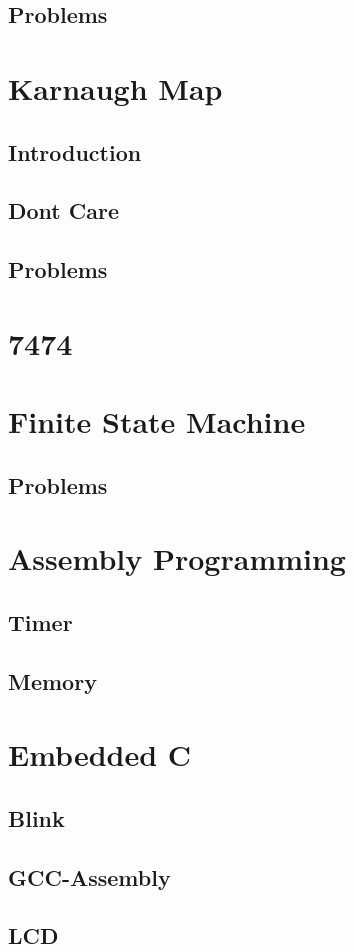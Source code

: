 \documentclass[11pt]{book}
\begin{document}
\section{Problems}

\chapter{Karnaugh Map}
\section{Introduction}

\section{Dont Care}

\section{Problems}

\chapter{7474}

\chapter{Finite State Machine}

\section{Problems}

\chapter{Assembly Programming}




\section{Timer}

\section{Memory}

\chapter{Embedded C}
\section{Blink}



\section{GCC-Assembly}

\section{LCD}




\backmatter
\appendix
\iffalse
\chapter{Manual}

\fi


\latexprintindex
\end{document}
